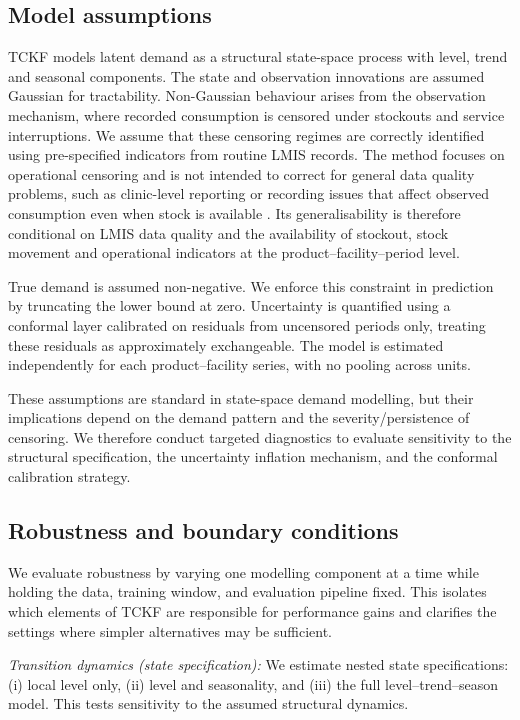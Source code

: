 \documentclass[
  11pt,
  authoryear,
  doubleblind,
  3p]{elsarticle}
\begin{document}
\subsection{Model assumptions}\label{model-assumptions}

TCKF models latent demand as a structural state-space process with
level, trend and seasonal components. The state and observation
innovations are assumed Gaussian for tractability. Non-Gaussian
behaviour arises from the observation mechanism, where recorded
consumption is censored under stockouts and service interruptions. We
assume that these censoring regimes are correctly identified using
pre-specified indicators from routine LMIS records. The method focuses
on operational censoring and is not intended to correct for general data
quality problems, such as clinic-level reporting or recording issues
that affect observed consumption even when stock is available
\citep{karamshetty2022}. Its generalisability is therefore conditional
on LMIS data quality and the availability of stockout, stock movement
and operational indicators at the product--facility--period level.

True demand is assumed non-negative. We enforce this constraint in
prediction by truncating the lower bound at zero. Uncertainty is
quantified using a conformal layer calibrated on residuals from
uncensored periods only, treating these residuals as approximately
exchangeable. The model is estimated independently for each
product--facility series, with no pooling across units.

These assumptions are standard in state-space demand modelling, but
their implications depend on the demand pattern and the
severity/persistence of censoring. We therefore conduct targeted
diagnostics to evaluate sensitivity to the structural specification, the
uncertainty inflation mechanism, and the conformal calibration strategy.

\subsection{Robustness and boundary
conditions}\label{robustness-and-boundary-conditions}

We evaluate robustness by varying one modelling component at a time
while holding the data, training window, and evaluation pipeline fixed.
This isolates which elements of TCKF are responsible for performance
gains and clarifies the settings where simpler alternatives may be
sufficient.

\emph{Transition dynamics (state specification):} We estimate nested
state specifications: (i) local level only, (ii) level and seasonality,
and (iii) the full level--trend--season model. This tests sensitivity to
the assumed structural dynamics.
\end{document}
